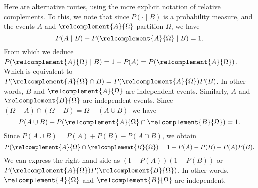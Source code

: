 Here are alternative routes, using the more explicit notation of relative complements.
To this, we note that since $P(\cdot \mid B)$ is a probability measure, and the events $A$ and $\relcomplement{A}{\Omega }$ partition $\Omega $, we have
\[
P(A \mid  B) + P(\relcomplement{A}{\Omega } \mid  B) = 1.
\]
From which we deduce $P(\relcomplement{A}{\Omega } \mid  B) = 1 - P(A) = P(\relcomplement{A}{\Omega })$.
Which is equivalent to $P(\relcomplement{A}{\Omega } \cap  B) = P(\relcomplement{A}{\Omega })P(B)$.
In other words, $B$ and $\relcomplement{A}{\Omega }$ are independent events.
Similarly, $A$ and $\relcomplement{B}{\Omega }$ are independent events.
Since $(\Omega  - A) \cap  (\Omega  - B) = \Omega  - (A \cup B)$, we have
\[
P(A \cup B) + P(\relcomplement{A}{\Omega } \cap \relcomplement{B}{\Omega }) = 1.
\]
Since $P(A \cup B) = P(A) + P(B) - P(A \cap  B)$, we obtain
\[
P(\relcomplement{A}{\Omega } \cap  \relcomplement{B}{\Omega }) = 1 - P(A) - P(B) - P(A)P(B).
\]
We can express the right hand side as $(1 - P(A))(1 - P(B))$ or $P(\relcomplement{A}{\Omega })P(\relcomplement{B}{\Omega })$.
In other words, $\relcomplement{A}{\Omega }$ and $\relcomplement{B}{\Omega }$ are independent.
